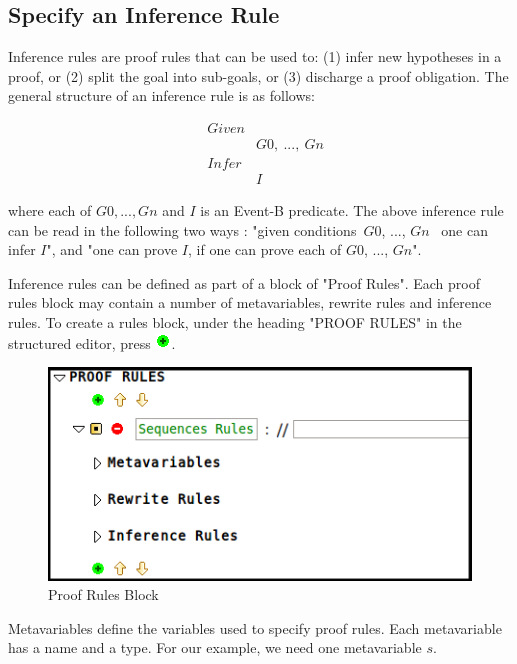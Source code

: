 \subsection{Specify an Inference Rule}
Inference rules are proof rules that can be used to: (1) infer new hypotheses in a proof, or (2) split the goal into sub-goals, or (3) discharge a proof obligation. The general structure of an inference rule is as follows:

\begin{eqnarray*}
	&Given& \\
	&~~~~~&G0,~...,~Gn \\
	&Infer& \\
	&~~~~~&I
\end{eqnarray*}

where each of $G0, ..., Gn$ and $I$ is an Event-B predicate. The above inference rule can be read in the following two ways : "given conditions~$G0$, ..., $Gn$~ one can infer $I$", and "one can prove $I$, if one can prove each of $G0$, ..., $Gn$".

\par 
Inference rules can be defined as part of a block of "Proof Rules". Each proof rules block may contain a number of metavariables, rewrite rules and inference rules. To create a rules block, under the heading "PROOF RULES" in the structured editor, press \includegraphics{images/add.png}.

\begin{center}
\begin{figure}
\label{blockEx}
\includegraphics{images/Block.png}
\caption{Proof Rules Block}
\end{figure}
\end{center}

Metavariables define the variables used to specify proof rules. Each metavariable has a name and a type. For our example, we need one metavariable $s$.


